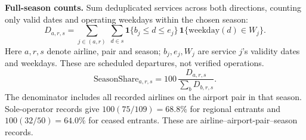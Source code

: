 \begingroup
\renewcommand{\theHequation}{review-o3-season-departures}
\textbf{Full-season counts.} Sum deduplicated services across both directions, counting only valid dates and operating weekdays within the chosen season:
\begin{equation}
D_{a,r,s}=\sum_{j\in(a,r)}\ \sum_{d\in s}
\mathbf{1}\{b_j\leq d\leq e_j\}\,
\mathbf{1}\{\mathrm{weekday}(d)\in W_j\}.
\tag{O3.1}\label{eq:o3-season-departures}
\end{equation}
Here $a,r,s$ denote airline, pair and season; $b_j,e_j,W_j$ are service $j$'s validity dates and weekdays. These are scheduled departures, not verified operations.
\renewcommand{\theHequation}{review-o3-season-share}
\begin{equation}
\mathrm{SeasonShare}_{a,r,s}=100\,
\frac{D_{a,r,s}}{\sum_b D_{b,r,s}}.
\tag{O3.2}\label{eq:o3-season-share}
\end{equation}
The denominator includes all recorded airlines on the airport pair in that season. Sole-operator records give $100(75/109)=68.8\%$ for regional entrants and $100(32/50)=64.0\%$ for ceased entrants. These are airline--airport-pair--season records.
\endgroup
\par
